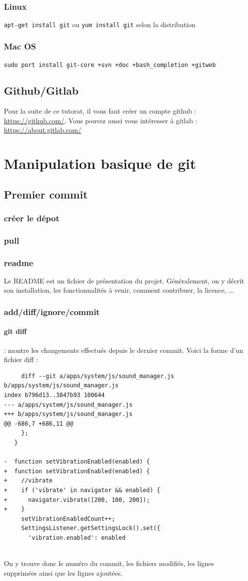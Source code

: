 \documentclass[a4paper,10pt]{article}
\begin{document}
    \subsubsection{Linux}
\verb|apt-get install git| ou \verb|yum install git| selon la distribution
    \subsubsection{Mac OS}
\verb|sudo port install git-core +svn +doc +bash_completion +gitweb|
  \subsection{Github/Gitlab}
Pour la suite de ce tutorat, il vous faut créer un compte github : \url{https://github.com/}.
Vous pouvez aussi vous intéresser à gitlab : \url{https://about.gitlab.com/}
\section{Manipulation basique de git}
  \subsection{Premier commit}
     \subsubsection{créer le dépot}
     \subsubsection{pull}
     \subsubsection{readme}
     Le README est un fichier de présentation du projet. Généralement, on y décrit son installation, les fonctionnalités à venir, comment contribuer, la licence, ...
     \subsubsection{add/diff/ignore/commit}
\paragraph{git diff} : montre les changements effectués depuis le dernier commit. Voici la forme d'un fichier diff :
\begin{verbatim}
     diff --git a/apps/system/js/sound_manager.js b/apps/system/js/sound_manager.js
index b796d13..3847b93 100644
--- a/apps/system/js/sound_manager.js
+++ b/apps/system/js/sound_manager.js
@@ -686,7 +686,11 @@
     };
   }
 
-  function setVibrationEnabled(enabled) {
+  function setVibrationEnabled(enabled) {    
+    //vibrate
+    if ('vibrate' in navigator && enabled) {
+      navigator.vibrate([200, 100, 200]);
+    }
     setVibrationEnabledCount++;
     SettingsListener.getSettingsLock().set({
       'vibration.enabled': enabled
    
\end{verbatim}   
     On y trouve donc le numéro du commit, les fichiers modifiés, les lignes supprimées ainsi que les lignes ajoutées.
\end{document}
